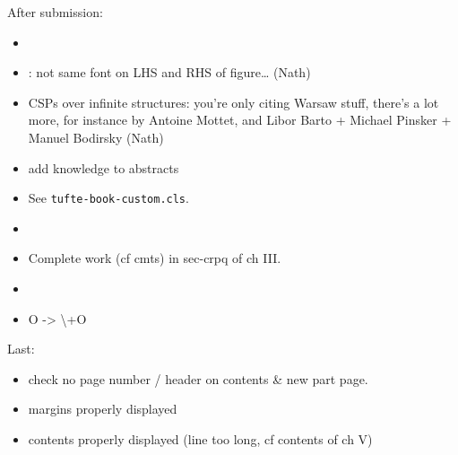 After submission:
\begin{itemize}
	\item {}
	\item {}: not same font on LHS and RHS of figure… (Nath)
	\item CSPs over infinite structures: you're only citing Warsaw stuff, there's a lot more, for instance by Antoine Mottet, and Libor Barto + Michael Pinsker + Manuel Bodirsky (Nath)
	\item add knowledge to abstracts
	\item {}
		See \texttt{tufte-book-custom.cls}.
	\item {}
	\item Complete work (cf cmts) in sec-crpq of ch III.
	\item {}
	\item O -> \backslash+O
\end{itemize}

Last:
\begin{itemize}
	\item check no page number / header on contents \& new part page.
	\item margins properly displayed
	\item contents properly displayed (line too long, cf contents of ch V)
\end{itemize}